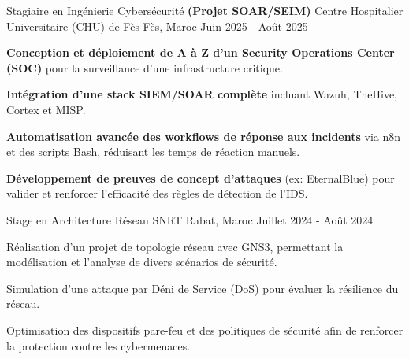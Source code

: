 


\begin{cventries}

  \cventry
  {Stagiaire en Ingénierie Cybersécurité \textbf{(Projet SOAR/SEIM)}} %
  {Centre Hospitalier Universitaire (CHU) de Fès} %
  {Fès, Maroc} %
  {Juin 2025 - Août 2025} %
  {
    \begin{cvitems}
      \item {
                  \textbf{Conception et déploiement de A à Z d'un Security Operations Center (SOC)} pour la surveillance d'une infrastructure critique.}
      \item {
                  \textbf{Intégration d'une stack SIEM/SOAR complète} incluant Wazuh, TheHive, Cortex et MISP.}
      \item {
                  \textbf{Automatisation avancée des workflows de réponse aux incidents} via n8n et des scripts Bash, réduisant les temps de réaction manuels.}
      \item {
                  \textbf{Développement de preuves de concept d'attaques} (ex: EternalBlue) pour valider et renforcer l'efficacité des règles de détection de l'IDS.}
    \end{cvitems}
  }

  \cventry
  {Stage en Architecture Réseau} %
  {SNRT} %
  {Rabat, Maroc} %
  {Juillet 2024 - Août 2024} %
  {
    \begin{cvitems} %
      \item {Réalisation d'un projet de topologie réseau avec GNS3, permettant la modélisation et l'analyse de divers scénarios de sécurité.}
      \item {Simulation d'une attaque par Déni de Service (DoS) pour évaluer la résilience du réseau.}
      \item {Optimisation des dispositifs pare-feu et des politiques de sécurité afin de renforcer la protection contre les cybermenaces.}
    \end{cvitems}
  }
\end{cventries}

